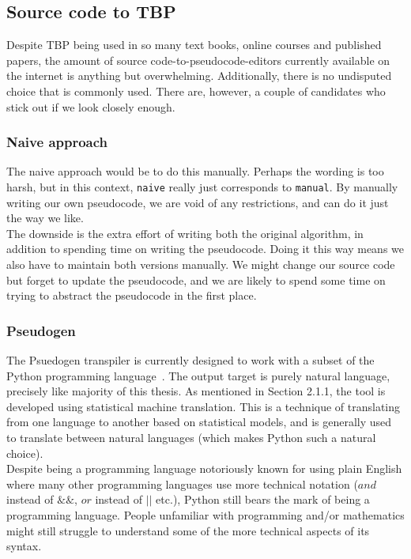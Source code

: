\subsection{Source code to TBP}

Despite TBP being used in so many text books, online courses and published papers, the amount of source code-to-pseudocode-editors currently available on the internet is anything but overwhelming. Additionally, there is no undisputed choice that is commonly used. There are, however, a couple of candidates who stick out if we look closely enough.

\subsubsection{Naive approach}

The naive approach would be to do this manually. Perhaps the wording is too harsh, but in this context, \texttt{naive} really just corresponds to \texttt{manual}. By manually writing our own pseudocode, we are void of any restrictions, and can do it just the way we like. \\

The downside is the extra effort of writing both the original algorithm, in addition to spending time on writing the pseudocode. Doing it this way means we also have to maintain both versions manually. We might change our source code but forget to update the pseudocode, and we are likely to spend some time on trying to abstract the pseudocode in the first place.

\subsubsection{Pseudogen}

The Psuedogen transpiler is currently designed to work with a subset of the Python programming language~\cite{DBLP:conf/kbse/OdaFNHSTN15}. The output target is purely natural language, precisely like majority of this thesis. As mentioned in Section 2.1.1, the tool is developed using statistical machine translation. This is a technique of translating from one language to another based on statistical models, and is generally used to translate between natural languages (which makes Python such a natural choice). \hfill \\

Despite being a programming language notoriously known for using plain English where many other programming languages use more technical notation ($and$ instead of $\&\&$, $or$ instead of $||$ etc.), Python still bears the mark of being a programming language. People unfamiliar with programming and/or mathematics might still struggle to understand some of the more technical aspects of its syntax. \hfill \\

